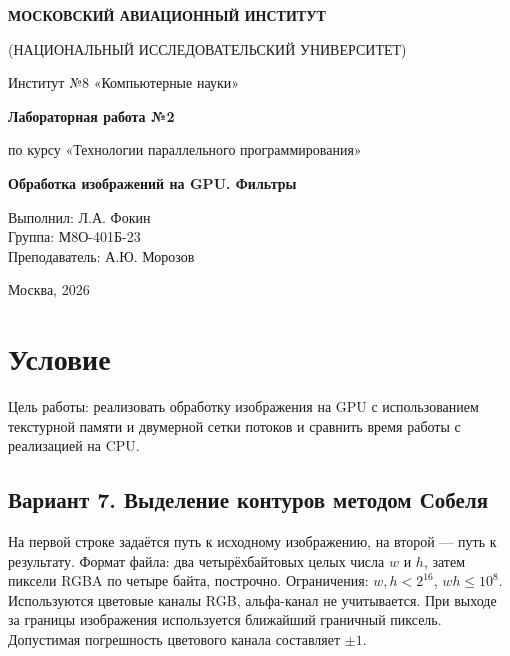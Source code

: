 \documentclass[12pt,a4paper]{article}
\begin{document}
\begin{titlepage}
    \centering
    {\bfseries\large МОСКОВСКИЙ АВИАЦИОННЫЙ ИНСТИТУТ\par
    (НАЦИОНАЛЬНЫЙ ИССЛЕДОВАТЕЛЬСКИЙ УНИВЕРСИТЕТ)\par}
    \vspace{0.8cm}
    Институт №8 «Компьютерные науки»\par
    \vspace{3.5cm}
    {\bfseries\Large Лабораторная работа №2\par}
    \vspace{0.3cm}
    {\large по курсу «Технологии параллельного программирования»\par}
    \vspace{0.8cm}
    {\bfseries\large Обработка изображений на GPU. Фильтры\par}
    \vspace{4cm}
    \begin{flushleft}
    \hspace*{7.5cm}
    \begin{minipage}{8cm}
        Выполнил: Л.А. Фокин\\[0.3cm]
        Группа: М8О-401Б-23\\[0.3cm]
        Преподаватель:  А.Ю. Морозов
    \end{minipage}
    \end{flushleft}
    \vfill
    {\large Москва, 2026}
\end{titlepage}

\tableofcontents
\newpage

\section{Условие}
Цель работы: реализовать обработку изображения на GPU с использованием текстурной памяти и двумерной сетки потоков и сравнить время работы с реализацией на CPU.

\subsection*{Вариант 7. Выделение контуров методом Собеля}
На первой строке задаётся путь к исходному изображению, на второй --- путь к результату. Формат файла: два четырёхбайтовых целых числа $w$ и $h$, затем пиксели RGBA по четыре байта, построчно. Ограничения: $w,h < 2^{16}$, $w h \leq 10^8$. Используются цветовые каналы RGB, альфа-канал не учитывается. При выходе за границы изображения используется ближайший граничный пиксель. Допустимая погрешность цветового канала составляет $\pm1$.
\end{document}
